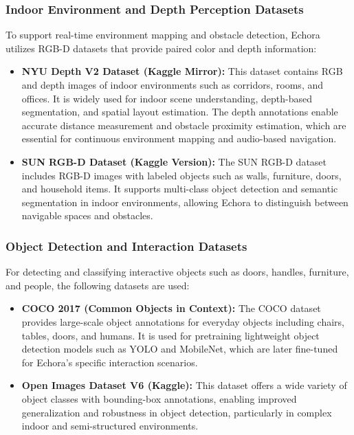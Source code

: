 \subsubsection{Indoor Environment and Depth Perception Datasets}

To support real-time environment mapping and obstacle detection, Echora utilizes RGB-D
datasets that provide paired color and depth information:

\begin{itemize}
    \item \textbf{NYU Depth V2 Dataset (Kaggle Mirror):}  
    This dataset contains RGB and depth images of indoor environments such as corridors,
    rooms, and offices. It is widely used for indoor scene understanding, depth-based
    segmentation, and spatial layout estimation. The depth annotations enable accurate
    distance measurement and obstacle proximity estimation, which are essential for
    continuous environment mapping and audio-based navigation.

    \item \textbf{SUN RGB-D Dataset (Kaggle Version):}  
    The SUN RGB-D dataset includes RGB-D images with labeled objects such as walls,
    furniture, doors, and household items. It supports multi-class object detection and
    semantic segmentation in indoor environments, allowing Echora to distinguish between
    navigable spaces and obstacles.
\end{itemize}

\subsubsection{Object Detection and Interaction Datasets}

For detecting and classifying interactive objects such as doors, handles, furniture, and people,
the following datasets are used:

\begin{itemize}
    \item \textbf{COCO 2017 (Common Objects in Context):}  
    The COCO dataset provides large-scale object annotations for everyday objects including
    chairs, tables, doors, and humans. It is used for pretraining lightweight object detection
    models such as YOLO and MobileNet, which are later fine-tuned for Echora’s specific
    interaction scenarios.

    \item \textbf{Open Images Dataset V6 (Kaggle):}  
    This dataset offers a wide variety of object classes with bounding-box annotations,
    enabling improved generalization and robustness in object detection, particularly in
    complex indoor and semi-structured environments.
\end{itemize}

